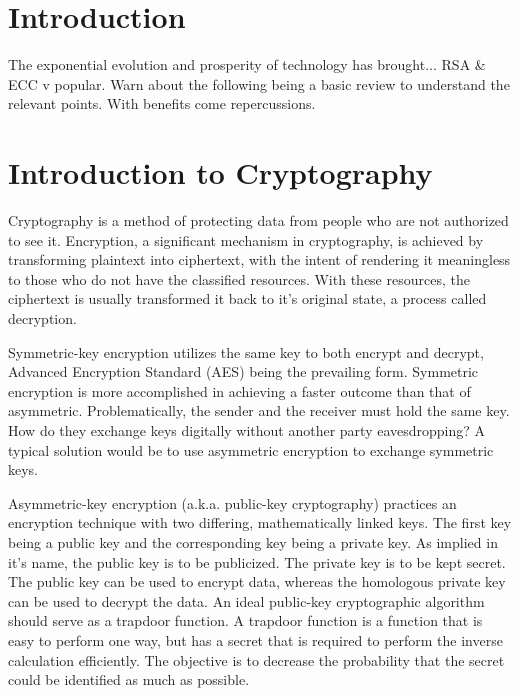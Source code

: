 \section{Introduction}
The exponential evolution and prosperity of technology has brought... RSA \& ECC v popular. Warn about the following being a basic review to understand the relevant points. With benefits come repercussions.

\section{Introduction to Cryptography}
Cryptography is a method of protecting data from people who are not authorized to see it. Encryption, a significant mechanism in cryptography, is achieved by transforming plaintext into ciphertext, with the intent of rendering it meaningless to those who do not have the classified resources. With these resources, the ciphertext is usually transformed it back to it's original state, a process called decryption.

Symmetric-key encryption utilizes the same key to both encrypt and decrypt, Advanced Encryption Standard (AES) being the prevailing form. Symmetric encryption is more accomplished in achieving a faster outcome than that of asymmetric. Problematically, the sender and the receiver must hold the same key. How do they exchange keys digitally without another party eavesdropping? A typical solution would be to use asymmetric encryption to exchange symmetric keys.

Asymmetric-key encryption (a.k.a. public-key cryptography) practices an encryption technique with two differing, mathematically linked keys. The first key being a public key and the corresponding key being a private key. As implied in it's name, the public key is to be publicized. The private key is to be kept secret. The public key can be used to encrypt data, whereas the homologous private key can be used to decrypt the data. An ideal public-key cryptographic algorithm should serve as a trapdoor function. A trapdoor function is a function that is easy to perform one way, but has a secret that is required to perform the inverse calculation efficiently. The objective is to decrease the probability that the secret could be identified as much as possible.

